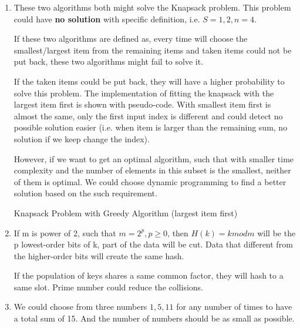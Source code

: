 \documentclass{assignment}
\begin{document}
    \begin{homeworkProblem}
    \begin{enumerate}
    \item These two algorithms both might solve the Knapsack problem. This problem could have \textbf{no solution} with specific definition, i.e. $S={1,2}, n=4$. 
    
    If these two algorithms are defined as, every time will choose the smallest/largest item from the remaining items and taken items could not be put back, these two algorithms might fail to solve it. 
    
    If the taken items could be put back, they will have a higher probability to solve this problem. The implementation of fitting the knapsack with the largest item first is shown with pseudo-code. With smallest item first is almost the same, only the first input index is different and could detect no possible solution easier (i.e. when item is larger than the remaining sum, no solution if we keep change the index).
    
     However, if we want to get an optimal algorithm, such that with smaller time complexity and the number of elements in this subset is the smallest, neither of them is optimal. We could choose dynamic programming to find a better solution based on the such requirement.
  
    
    \begin{algorithm}[]
    \BlankLine
{}
\caption{Knapsack Problem with Greedy Algorithm (largest item first)} 
\end{algorithm}

\item If m is power of 2, such that $m=2^p, p\geq 0$, then $H(k) = k mod m$ will be the p lowest-order bits of k, part of the data will be cut. Data that different from the higher-order bits will create the same hash. 

If the population of keys shares a same common factor, they will hash to a same slot. Prime number could reduce  the collisions.
\item We could choose from three numbers $1, 5, 11$ for any number of times to have a total sum of 15. And the number of numbers should be as small as possible.


\end{enumerate}
\end{homeworkProblem}
\end{document}
